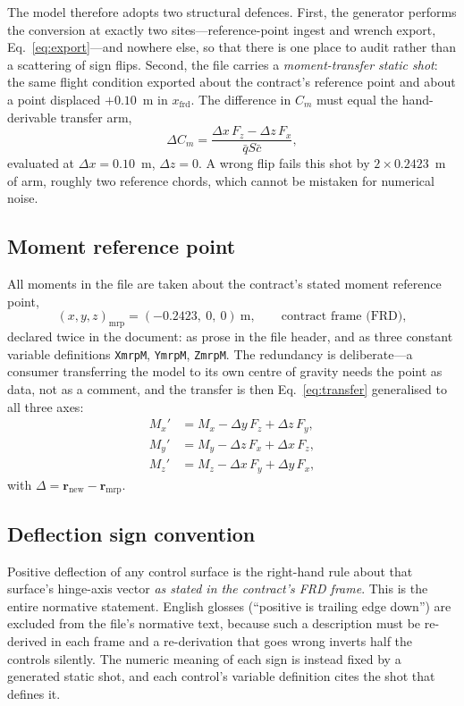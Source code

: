 \documentclass[11pt,a4paper]{article}
\newcommand{\varid}[1]{\texttt{\small #1}}
\begin{document}
The model therefore adopts two structural defences. First, the generator
performs the conversion at exactly two sites---reference-point ingest and
wrench export, Eq.~\eqref{eq:export}---and nowhere else, so that there is
one place to audit rather than a scattering of sign flips. Second, the
file carries a \emph{moment-transfer static shot}: the same flight
condition exported about the contract's reference point and about a point
displaced $+0.10$~m in $x_{\mathrm{frd}}$. The difference in $C_m$ must
equal the hand-derivable transfer arm,
\begin{equation}
\Delta C_m = \frac{\Delta x \, F_z - \Delta z \, F_x}{\bar q S \bar c},
\label{eq:transfer}
\end{equation}
evaluated at $\Delta x = 0.10$~m, $\Delta z = 0$. A wrong flip fails this
shot by $2 \times 0.2423$~m of arm, roughly two reference chords, which
cannot be mistaken for numerical noise.

\subsection{Moment reference point}

All moments in the file are taken about the contract's stated moment
reference point,
\begin{equation}
(x, y, z)_{\mathrm{mrp}} = (-0.2423,\ 0,\ 0)~\mathrm{m}, \qquad
\text{contract frame (FRD)},
\end{equation}
declared twice in the document: as prose in the file header, and as three
constant variable definitions \varid{XmrpM}, \varid{YmrpM},
\varid{ZmrpM}. The redundancy is deliberate---a consumer transferring the
model to its own centre of gravity needs the point as data, not as a
comment, and the transfer is then Eq.~\eqref{eq:transfer} generalised to
all three axes:
\begin{align}
M_x' &= M_x - \Delta y\,F_z + \Delta z\,F_y, \\
M_y' &= M_y - \Delta z\,F_x + \Delta x\,F_z, \\
M_z' &= M_z - \Delta x\,F_y + \Delta y\,F_x,
\end{align}
with $\Delta = \mathbf{r}_{\mathrm{new}} - \mathbf{r}_{\mathrm{mrp}}$.

\subsection{Deflection sign convention}

Positive deflection of any control surface is the right-hand rule about
that surface's hinge-axis vector \emph{as stated in the contract's FRD
frame}. This is the entire normative statement. English glosses
(``positive is trailing edge down'') are excluded from the file's
normative text, because such a description must be re-derived in each
frame and a re-derivation that goes wrong inverts half the controls
silently. The numeric meaning of each sign is instead fixed by a
generated static shot, and each control's variable definition cites the
shot that defines it.
\end{document}
